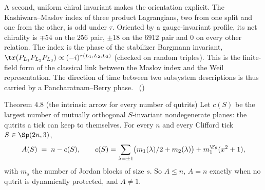 
A second, uniform chiral invariant makes the orientation explicit. The Kashiwara--Maslov index of three product
Lagrangians, two from one split and one from the other, is odd under $\tau$. Oriented by a gauge-invariant profile, its
net chirality is $\mp54$ on the $256$ pair, $\pm18$ on the $6912$ pair and $0$ on every other relation. The index is
the phase of the stabilizer Bargmann invariant, $\tr(P_{L_1}P_{L_2}P_{L_3})\propto(-i)^{\tau(L_1,L_2,L_3)}$ (checked on
random triples). This is the finite-field form of the classical link between the Maslov index and the Weil
representation. The direction of time between two subsystem descriptions is thus carried by a Pancharatnam--Berry
phase. \tierC\ ()

\begin{result}{Theorem 4.8 (the intrinsic arrow for every number of qutrits) \hfill \tierT}
Let $c(S)$ be the largest number of mutually orthogonal $S$-invariant nondegenerate planes: the qutrits a tick can keep
to themselves. For every $n$ and every Clifford tick $S\in\Sp(2n,3)$,
\[
A(S)\;=\;n-c(S),
\qquad
c(S)=\sum_{\lambda=\pm1}\bigl(m_1(\lambda)/2+m_2(\lambda)\bigr)+m_1^{\F_9}(x^2+1),
\]
with $m_s$ the number of Jordan blocks of size $s$. So $A\le n$, $A=n$ exactly when no qutrit is dynamically protected,
and $A\ne1$.
\end{result}

